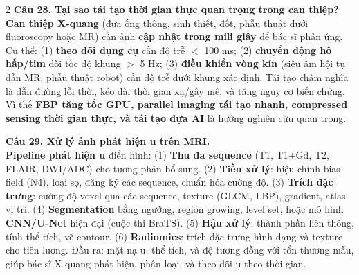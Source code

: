 \begin{paracol}{2}
\textbf{Câu 28. Tại sao tái tạo thời gian thực quan trọng trong can thiệp?}\\
\textbf{Can thiệp X-quang} (đưa ống thông, sinh thiết, đốt, phẫu thuật dưới fluoroscopy hoặc MR) cần ảnh \textbf{cập nhật trong mili giây} để bác sĩ phản ứng. Cụ thể: (1) \textbf{theo dõi dụng cụ} cần độ trễ $<$ 100 ms; (2) \textbf{chuyển động hô hấp/tim} đòi tốc độ khung $>$ 5 Hz; (3) \textbf{điều khiển vòng kín} (siêu âm hội tụ dẫn MR, phẫu thuật robot) cần độ trễ dưới khung xác định. Tái tạo chậm nghĩa là dẫn đường lỗi thời, kéo dài thời gian xạ/gây mê, và tăng nguy cơ biến chứng. Vì thế \textbf{FBP tăng tốc GPU, parallel imaging tái tạo nhanh, compressed sensing thời gian thực, và tái tạo dựa AI} là hướng nghiên cứu quan trọng.

\textbf{Câu 29. Xử lý ảnh phát hiện u trên MRI.}\\
\textbf{Pipeline phát hiện u} điển hình: (1) \textbf{Thu đa sequence} (T1, T1+Gd, T2, FLAIR, DWI/ADC) cho tương phản bổ sung. (2) \textbf{Tiền xử lý}: hiệu chỉnh bias-field (N4), loại sọ, đăng ký các sequence, chuẩn hóa cường độ. (3) \textbf{Trích đặc trưng}: cường độ voxel qua các sequence, texture (GLCM, LBP), gradient, atlas vị trí. (4) \textbf{Segmentation} bằng ngưỡng, region growing, level set, hoặc mô hình \textbf{CNN/U-Net} hiện đại (cuộc thi BraTS). (5) \textbf{Hậu xử lý}: thành phần liên thông, tính thể tích, vẽ contour. (6) \textbf{Radiomics}: trích đặc trưng hình dạng và texture cho tiên lượng. Đầu ra: mặt nạ u, thể tích, và độ tương đồng với tổn thương mẫu, giúp bác sĩ X-quang phát hiện, phân loại, và theo dõi u theo thời gian.

\end{paracol}
